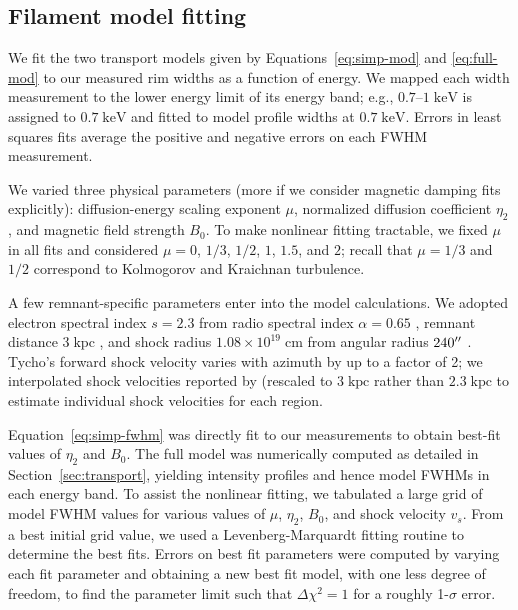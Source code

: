 \documentclass[iop, apj, numberedappendix, twocolappendix]{emulateapj}
\newcommand*{\mt}{\mathrm}
\newcommand*{\unit}[1]{\;\mt{#1}}  %
\begin{document}
\subsection{Filament model fitting}
\label{sec:fits}

We fit the two transport models given by Equations~\eqref{eq:simp-mod} and
\eqref{eq:full-mod} to our measured rim widths as a function of energy.
We mapped each width measurement to the lower energy limit of its energy band;
e.g., $0.7$--$1 \unit{keV}$ is assigned to $0.7 \unit{keV}$ and fitted to
model profile widths at $0.7 \unit{keV}$.  Errors in least squares fits
average the positive and negative errors on each FWHM measurement.

We varied three physical parameters (more if we consider magnetic damping fits
explicitly):
diffusion-energy scaling exponent $\mu$, normalized diffusion
coefficient $\eta_2$, and magnetic field strength $B_0$.
To make nonlinear fitting tractable, we fixed $\mu$ in all fits and considered
$\mu = 0$, $1/3$, $1/2$, $1$, $1.5$, and $2$;
recall that $\mu = 1/3$ and $1/2$ correspond to Kolmogorov and Kraichnan turbulence.

A few remnant-specific parameters enter into the model calculations.  We
adopted electron spectral index $s = 2.3$ from radio spectral index $\alpha = 0.65$
\citep{kothes2006},
remnant distance $3 \unit{kpc}$ \citep[cf.][]{hayato2010}, and
shock radius $1.08 \times 10^{19} \unit{cm}$ from angular radius $240\mbox{$^{\prime\prime}$}$
\citep{green2009}.  Tycho's forward shock velocity varies with azimuth by up to
a factor of 2; we interpolated shock velocities reported by
\citet{williams2013} (rescaled to $3 \unit{kpc}$ rather than $2.3 \unit{kpc}$
to estimate individual shock velocities for each region.

Equation~\eqref{eq:simp-fwhm} was directly fit to our measurements to obtain
best-fit values of $\eta_2$ and $B_0$.  The full model was numerically computed
as detailed in Section~\ref{sec:transport}, yielding intensity profiles and
hence model FWHMs in each energy band.  To assist the nonlinear
fitting, we tabulated a large grid of model FWHM values for various values of
$\mu$, $\eta_2$, $B_0$, and shock velocity $v_s$.  From a best initial grid
value, we used a Levenberg-Marquardt fitting routine to determine the best
fits.  Errors on best fit parameters were computed by varying each fit
parameter and obtaining a new best fit model, with one less degree of freedom,
to find the parameter limit such that $\Delta \chi^2 = 1$ for a roughly
1-$\sigma$ error.
\end{document}
